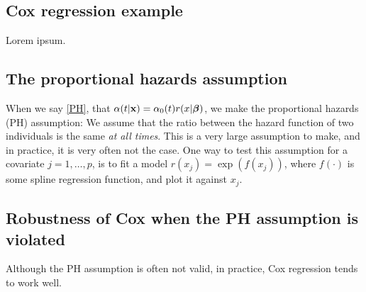 \subsection{Cox regression example}
Lorem ipsum.

\subsection{The proportional hazards assumption}
When we say \eqref{PH}, that $\alpha(t|\mathbf{x})=\alpha_0(t)r(x|\boldsymbol{\beta})$, we make the proportional hazards (PH) assumption: We assume that the ratio between the hazard function of two individuals is the same \textit{at all times}. This is a very large assumption to make, and in practice, it is very often not the case. One way to test this assumption for a covariate $j=1,\ldots,p$, is to fit a model $r(x_j)=\exp(f(x_j))$, where $f(\cdot)$ is some spline regression function, and plot it against $x_j$.

\subsection{Robustness of Cox when the PH assumption is violated}
Although the PH assumption is often not valid, in practice, Cox regression tends to work well. 

